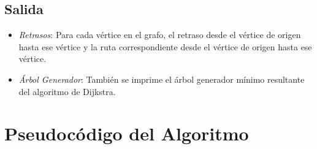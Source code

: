 \documentclass[a4paper,12pt]{article}
\begin{document}
\subsection*{Salida}
\begin{itemize}
    \item \textit{Retrasos}: Para cada vértice en el grafo, el retraso desde el vértice de origen hasta ese vértice y la ruta correspondiente desde el vértice de origen hasta ese vértice.

    \item \textit{Árbol Generador}: También se imprime el árbol generador mínimo resultante del algoritmo de Dijkstra.
\end{itemize}


\section*{Pseudocódigo del Algoritmo}
\end{document}
